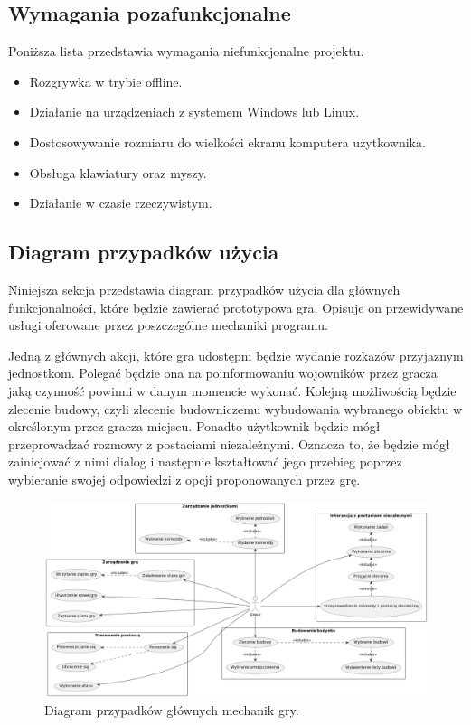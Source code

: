 \subsection{Wymagania pozafunkcjonalne}\label{ss:nonfun}
Poniższa lista przedstawia wymagania niefunkcjonalne projektu.

\begin{itemize}\label{list:nonfun}
  \item Rozgrywka w trybie offline.
  \item Działanie na urządzeniach z systemem Windows lub Linux.
  \item Dostosowywanie rozmiaru do wielkości ekranu komputera użytkownika.
  \item Obsługa klawiatury oraz myszy.
  \item Działanie w czasie rzeczywistym.
\end{itemize}

\subsection{Diagram przypadków użycia}\label{ss:usecase}
Niniejsza sekcja przedstawia diagram przypadków użycia dla głównych funkcjonalności, które będzie zawierać prototypowa gra.
Opisuje on przewidywane usługi oferowane przez poszczególne mechaniki programu.

Jedną z głównych akcji, które gra udostępni będzie wydanie rozkazów przyjaznym jednostkom. Polegać będzie ona na poinformowaniu
wojowników przez gracza jaką czynność powinni w danym momencie wykonać. Kolejną możliwością będzie zlecenie budowy, czyli
zlecenie budowniczemu wybudowania wybranego obiektu w określonym przez gracza miejscu. Ponadto użytkownik
będzie mógł przeprowadzać rozmowy z postaciami niezależnymi. Oznacza to, że będzie mógł zainicjować z nimi dialog i
następnie kształtować jego przebieg poprzez wybieranie swojej odpowiedzi z opcji proponowanych przez grę.

\begin{figure}[!htbp]
    \centering
    \includegraphics[width=1.0\textwidth]{images/diagrams/usecase.jpg}
    \caption{Diagram przypadków głównych mechanik gry.}\label{fig:usecases_d}
\end{figure}
\FloatBarrier

